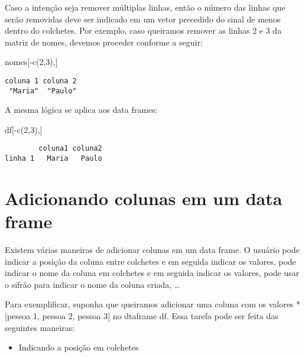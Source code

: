 \documentclass[
  letterpaper,
  DIV=11,
  numbers=noendperiod]{scrreprt}
\newenvironment{Shaded}{\begin{snugshade}}{\end{snugshade}}
\newcommand{\DecValTok}[1]{\textcolor[rgb]{0.68,0.00,0.00}{#1}}
\newcommand{\FunctionTok}[1]{\textcolor[rgb]{0.28,0.35,0.67}{#1}}
\newcommand{\NormalTok}[1]{\textcolor[rgb]{0.00,0.23,0.31}{#1}}
\newcommand{\SpecialCharTok}[1]{\textcolor[rgb]{0.37,0.37,0.37}{#1}}
\providecommand{\tightlist}{%
  \setlength{\itemsep}{0pt}\setlength{\parskip}{0pt}}\usepackage{longtable,booktabs,array}
\begin{document}
Caso a intenção seja remover múltiplas linhas, então o número das linhas
que serão removidas deve ser indicado em um vetor precedido do sinal de
menos dentro do colchetes. Por exemplo, caso queiramos remover as linhas
2 e 3 da matriz de nomes, devemos proceder conforme a seguir:

\begin{Shaded}
\begin{Highlighting}[]
\NormalTok{nomes[}\SpecialCharTok{{-}}\FunctionTok{c}\NormalTok{(}\DecValTok{2}\NormalTok{,}\DecValTok{3}\NormalTok{),]}
\end{Highlighting}
\end{Shaded}

\begin{verbatim}
coluna 1 coluna 2 
 "Maria"  "Paulo" 
\end{verbatim}

A mesma lógica se aplica aos data frames:

\begin{Shaded}
\begin{Highlighting}[]
\NormalTok{df[}\SpecialCharTok{{-}}\FunctionTok{c}\NormalTok{(}\DecValTok{2}\NormalTok{,}\DecValTok{3}\NormalTok{),]}
\end{Highlighting}
\end{Shaded}

\begin{verbatim}
        coluna1 coluna2
linha 1   Maria   Paulo
\end{verbatim}

\section{Adicionando colunas em um data
frame}\label{adicionando-colunas-em-um-data-frame}

Existem várias maneiras de adicionar colunas em um data frame. O usuário
pode indicar a posição da coluna entre colchetes e em seguida indicar os
valores, pode indicar o nome da coluna em colchetes e em seguida indicar
os valores, pode usar o sifrão para indicar o nome da coluna criada,
\ldots{}

Para exemplificar, suponha que queiramos adicionar uma coluna com os
valores *{[}pessoa 1, pessoa 2, pessoa 3{]} no dtaframe df. Essa tarefa
pode ser feita das seguintes maneiras:

\begin{itemize}
\tightlist
\item
  Indicando a posição em colchetes
\end{itemize}
\end{document}
